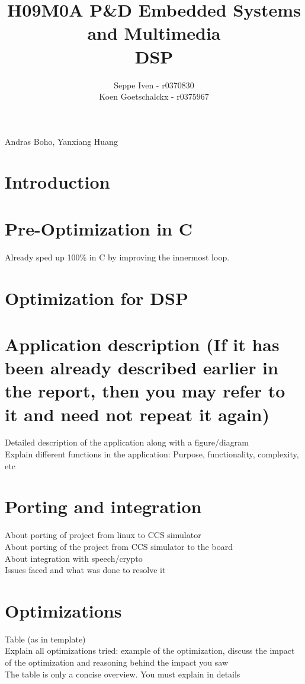 \documentclass[a4paper]{article}
\title{H09M0A P\&D Embedded Systems and Multimedia \\ DSP}
\author{Seppe Iven - r0370830 \\ Koen Goetschalckx - r0375967}
\begin{document}
 
\maketitle
\begin{center}Andras Boho, Yanxiang Huang
\end{center}

\section{Introduction}

\section{Pre-Optimization in C}
Already sped up 100\% in C by improving the innermost loop.

\section{Optimization for DSP}

\section{Application description (If it has been already described earlier in the report, then you may refer to it and need not repeat it again)}
Detailed description of the application along with a figure/diagram \\
Explain different functions in the application: Purpose, functionality, complexity, etc

\section{Porting and integration}
About porting of project from linux to CCS simulator \\
About porting of the project from CCS simulator to the board \\
About integration with speech/crypto \\
Issues faced and what was done to resolve it

\section{Optimizations}
Table (as in template) \\
Explain all optimizations tried: example of the optimization, discuss the impact of the optimization and reasoning behind the impact you saw \\
The table is only a concise overview. You must explain in details
\end{document}
